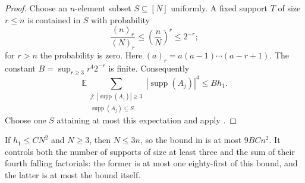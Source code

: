 \begin{proof}
Choose an $n$-element subset $S\subseteq[N]$ uniformly.  A fixed support
$T$ of size $r\le n$ is contained in $S$ with probability
\[
 \frac{(n)_r}{(N)_r}\le\left(\frac nN\right)^r\le2^{-r};
\]
for $r>n$ the probability is zero.  Here $(a)_r=a(a-1)\cdots(a-r+1)$.
The constant $B=\sup_{r\ge3}r^4 2^{-r}$ is finite.  Consequently
\[
 \mathbb E\sum_{\substack{j:\,|\operatorname{supp}(A_j)|\ge3\\
                           \operatorname{supp}(A_j)\subseteq S}}
             |\operatorname{supp}(A_j)|^4
 \le Bh_1.
\]
Choose one $S$ attaining at most this expectation and apply
.
\end{proof}

If $h_1\le CN^2$ and $N\ge3$, then $N\le3n$, so the bound in
 is at most $9BCn^2$.
It controls both the number of supports of size at least three and the
sum of their fourth falling factorials: the former is at most one
eighty-first of this bound, and the latter is at most the bound itself.
